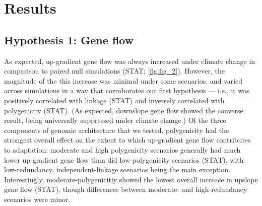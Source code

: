 \documentclass[9pt,twocolumn,twoside,lineno]{pnas-new}
\begin{document}
\section*{Results}

\subsection{Hypothesis 1: Gene flow}
As expected, up-gradient gene flow was always
increased under climate change in comparison to paired null
simulations (STAT; \ref{fig:fig_2}).
However, the magnitude of the this increase was minimal under
some scenarios, and varied across simulations in a way that corroborates
our first hypothesis --- i.e., it was positively correlated with linkage (STAT)
and inversely correlated with polygenicity (STAT).
(As expected, downslope gene flow showed the converse result, being
universally suppressed under climate change.)
Of the three components of genomic architecture that we tested,
polygenicity had the strongest overall effect on the extent to which
up-gradient gene flow contributes to adaptation:
moderate and high polygenicity scenarios generally had much lower
up-gradient gene flow than did low-polygenicity scenarios (STAT),
with low-redundancy, independent-linkage scenarios being the main exception.
Interestingly, moderate-polygenicitiy showed the lowest overall increase
in upslope gene flow (STAT), though differences between moderate- and
high-redundancy scenarios were minor.
\end{document}
